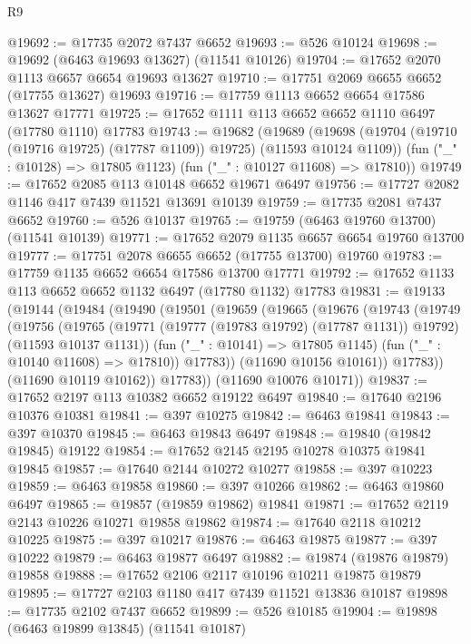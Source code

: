 \begin{lexlean}{R9}
\begin{coremodule}
@19692 := @17735 @2072 @7437 @6652
@19693 := @526 @10124
@19698 := @19692 (@6463 @19693 @13627) (@11541 @10126)
@19704 := @17652 @2070 @1113 @6657 @6654 @19693 @13627
@19710 := @17751 @2069 @6655 @6652 (@17755 @13627) @19693
@19716 := @17759 @1113 @6652 @6654 @17586 @13627 @17771
@19725 := @17652 @1111 @113 @6652 @6652 @1110 @6497 (@17780 @1110) @17783
@19743 := @19682
    (@19689
      (@19698 (@19704 (@19710 (@19716 @19725) (@17787 @1109)) @19725) (@11593 @10124 @1109))
      (fun ("_" : @10128) => @17805 @1123)
      (fun ("_" : @10127 @11608) => @17810))
@19749 := @17652 @2085 @113 @10148 @6652 @19671 @6497
@19756 := @17727 @2082 @1146 @417 @7439 @11521 @13691 @10139
@19759 := @17735 @2081 @7437 @6652
@19760 := @526 @10137
@19765 := @19759 (@6463 @19760 @13700) (@11541 @10139)
@19771 := @17652 @2079 @1135 @6657 @6654 @19760 @13700
@19777 := @17751 @2078 @6655 @6652 (@17755 @13700) @19760
@19783 := @17759 @1135 @6652 @6654 @17586 @13700 @17771
@19792 := @17652 @1133 @113 @6652 @6652 @1132 @6497 (@17780 @1132) @17783
@19831 := @19133
    (@19144
      (@19484
        (@19490
          (@19501
            (@19659
              (@19665
                (@19676
                  (@19743
                    (@19749
                      (@19756
                        (@19765
                          (@19771 (@19777 (@19783 @19792) (@17787 @1131)) @19792)
                          (@11593 @10137 @1131))
                        (fun ("_" : @10141) => @17805 @1145)
                        (fun ("_" : @10140 @11608) => @17810))
                      @17783))
                  (@11690 @10156 @10161))
                @17783))
            (@11690 @10119 @10162))
          @17783))
      (@11690 @10076 @10171))
@19837 := @17652 @2197 @113 @10382 @6652 @19122 @6497
@19840 := @17640 @2196 @10376 @10381
@19841 := @397 @10275
@19842 := @6463 @19841
@19843 := @397 @10370
@19845 := @6463 @19843 @6497
@19848 := @19840 (@19842 @19845) @19122
@19854 := @17652 @2145 @2195 @10278 @10375 @19841 @19845
@19857 := @17640 @2144 @10272 @10277
@19858 := @397 @10223
@19859 := @6463 @19858
@19860 := @397 @10266
@19862 := @6463 @19860 @6497
@19865 := @19857 (@19859 @19862) @19841
@19871 := @17652 @2119 @2143 @10226 @10271 @19858 @19862
@19874 := @17640 @2118 @10212 @10225
@19875 := @397 @10217
@19876 := @6463 @19875
@19877 := @397 @10222
@19879 := @6463 @19877 @6497
@19882 := @19874 (@19876 @19879) @19858
@19888 := @17652 @2106 @2117 @10196 @10211 @19875 @19879
@19895 := @17727 @2103 @1180 @417 @7439 @11521 @13836 @10187
@19898 := @17735 @2102 @7437 @6652
@19899 := @526 @10185
@19904 := @19898 (@6463 @19899 @13845) (@11541 @10187)

\end{coremodule}
\end{lexlean}
